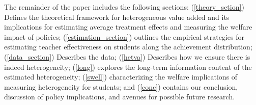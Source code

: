 \documentclass[12pt]{article}
\theoremstyle{definition}
\theoremstyle{definition}
\theoremstyle{definition}
\theoremstyle{definition}
\begin{document}


    
    
    The remainder of the paper includes the following sections: (\ref{theory_setion}) Defines the theoretical framework for heterogeneous value added and its implications for estimating average treatment effects and measuring the welfare impact of policies; (\ref{estimation_section}) outlines the empirical strategies for estimating teacher effectiveness on students along the achievement distribution; (\ref{data_section}) Describes the data; (\ref{hetva}) Describes how we ensure there is indeed heterogeneity; (\ref{long}) explores the long-term information content of the estimated heterogeneity; (\ref{swell}) characterizing the welfare implications of measuring heterogeneity for students; and (\ref{conc}) contains our conclusion, discussion of policy implications, and avenues for possible future research.
\end{document}

